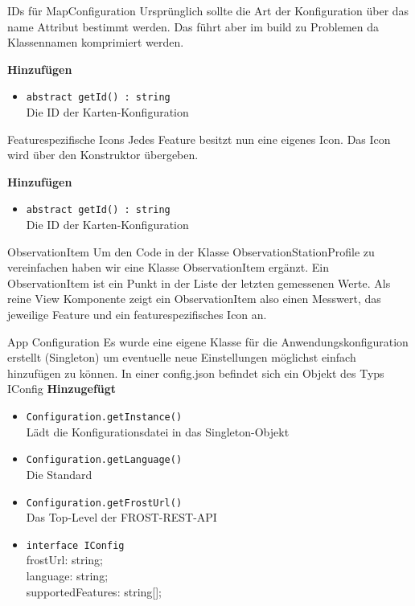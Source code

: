 \begin{Change}{IDs für MapConfiguration}
    Ursprünglich sollte die Art der Konfiguration über das name Attribut bestimmt werden.
    Das führt aber im build zu Problemen da Klassennamen komprimiert werden.

    \textbf{Hinzufügen}
    \begin{itemize}
        \item \texttt{abstract getId() : string}
        \\ Die ID der Karten-Konfiguration
    \end{itemize}
\end{Change}

\begin{Change}{Featurespezifische Icons}
    Jedes Feature besitzt nun eine eigenes Icon. Das Icon wird über den Konstruktor übergeben.

    \textbf{Hinzufügen}
    \begin{itemize} 
        \item \texttt{abstract getId() : string}
        \\ Die ID der Karten-Konfiguration
    \end{itemize}
    
\end{Change}

\begin{Change}{ObservationItem}
    Um den Code in der Klasse ObservationStationProfile zu vereinfachen haben wir eine Klasse ObservationItem ergänzt. Ein ObservationItem ist ein Punkt in der Liste der letzten gemessenen Werte. Als reine View Komponente zeigt ein ObservationItem also einen Messwert, das jeweilige Feature und ein featurespezifisches Icon an.
\end{Change}

\begin{Change}{App Configuration}
    Es wurde eine eigene Klasse für die Anwendungskonfiguration erstellt (Singleton)
    um eventuelle neue Einstellungen möglichst einfach hinzufügen zu können.
    In einer config.json befindet sich ein Objekt des Typs IConfig
    \textbf{Hinzugefügt}
    \begin{itemize}
        \item \texttt{Configuration.getInstance()}
        \\ Lädt die Konfigurationsdatei in das Singleton-Objekt
        \item \texttt{Configuration.getLanguage()}
        \\ Die Standard 
        \item \texttt{Configuration.getFrostUrl()}
        \\ Das Top-Level der FROST-REST-API
        \item \texttt{interface IConfig}
        \\ frostUrl: string;
        \\ language: string;
        \\ supportedFeatures: string[];
    \end{itemize}
\end{Change}

